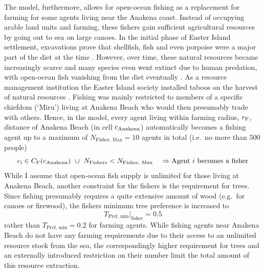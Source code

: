 The model, furthermore, allows for open-ocean fishing as a replacement for farming for some agents living near the Anakena coast.
Instead of occupying arable land units and farming, these fishers gain sufficient agricultural resources by going out to sea on large canoes.
In the initial phase of Easter Island settlement, excavations prove that shellfish, fish and even porpoise were a major part of the diet at the time \citep{Bahn2017}.
However, over time, these natural resources became increasingly scarce and many species even went extinct due to human predation, with open-ocean fish vanishing from the diet eventually \citep{Diamond2011}.
As a resource management institution the Easter Island society installed taboos on the harvest of natural resources \citep{Good2006}. 
Fishing was mainly restricted to members of a specific chiefdom (`Miru') living at Anakena Beach \citep{Bahn2017} who would then presumably trade with others.
Hence, in the model, every agent living within farming radius, $r_{\rm F}$, distance of Anakena Beach (in cell $c_{\rm Anakena}$) automatically becomes a fishing agent up to a maximum of $N_\text{Fisher, Max} = 10$ agents in total (i.e.\ no more than $500$ people)
\begin{equation}
 	c_{\rm i} \in C_{\rm F}(c_{\rm Anakena}) \  \cup \ N_\text{Fishers}<N_\text{Fisher, Max} \quad \Rightarrow \text{Agent }i\text{ becomes a fisher}
\end{equation}
While I assume that open-ocean fish supply is unlimited for those living at Anakena Beach, another constraint for the fishers is the requirement for trees.
Since fishing presumably requires a quite extensive amount of wood (e.g.\ for canoes or firewood), the fishers minimum tree preference is increased to
\begin{equation}
T_\text{Pref, min}|_\text{fisher} = 0.5
\end{equation} 
rather than $T_\text{Pref, min} = 0.2$ for farming agents.
While fishing agents near Anakena Beach do not have any farming requirements due to their access to an unlimited resource stock from the sea, the correspondingly higher requirement for trees and an externally introduced restriction on their number limit the total amount of this resource extraction.

